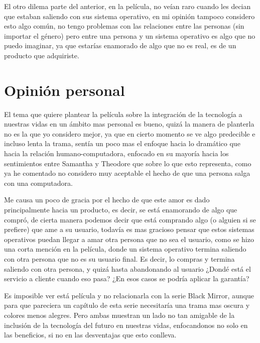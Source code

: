 \documentclass[paper=a4, fontsize=12pt]{scrartcl} %
\begin{document}
El otro dilema parte del anterior, en la película, no veían raro cuando les decian que estaban saliendo con sus sistema operativo, en mi opinión tampoco considero esto algo común, no tengo problemas con las relaciones entre las personas (sin importar el género) pero entre una persona y un sistema operativo es algo que no puedo imaginar, ya que estarías enamorado de algo que no es real, es de un producto que adquiriste. 


\section{Opinión personal}

El tema que quiere plantear la película sobre la integración de la tecnología a nuestras vidas en un ámbito mas personal es bueno, quizá la manera de planterla no es la que yo considero mejor, ya que en cierto momento se ve algo predecible e incluso lenta la trama, sentía un poco mas el enfoque hacia lo dramático que hacia la relación humano-computadora, enfocado en su mayoría hacia los sentimientos entre Samantha y Theodore que sobre lo que esto representa, como ya he comentado no considero muy aceptable el hecho de que una persona salga con una computadora.\vspace{4mm}

Me causa un poco de gracia por el hecho de que este amor es dado principalmente hacia un producto, es decir, se está enamorando de algo que compró, de cierta manera podemos decir que está comprando algo (o alguien si se prefiere) que ame a su usuario, todavía es mas gracioso pensar que estos sistemas operativos puedan llegar a amar otra persona que no sea el usuario, como se hizo una corta mención en la película, donde un sistema operativo termina saliendo con otra persona que no es su usuario final. Es decir, lo compras y termina saliendo con otra persona, y quizá hasta abandonando al usuario ¿Dondé está el servicio a cliente cuando eso pasa? ¿En esos casos se podría aplicar la garantía?\vspace{4mm}

Es imposible ver está película y no relacionarla con la serie Black Mirror, aunque para que pareciera un capítulo de esta serie necesitaría una trama mas oscura y colores menos alegres. Pero ambas muestran un lado no tan amigable de la inclusión de la tecnología del futuro en nuestras vidas, enfocandonos no solo en las beneficios, si no en las desventajas que esto conlleva.\vspace{4mm}
\end{document}
